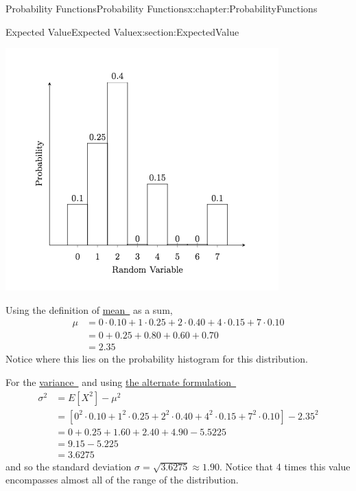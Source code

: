 \documentclass[oneside,10pt,]{book}
\newcommand{\xreffont}{\relax}
\numberwithin{equation}{section}
\begin{document}
\begin{chapterptx}{Probability Functions}{}{Probability Functions}{}{}{x:chapter:ProbabilityFunctions}
\begin{sectionptx}{Expected Value}{}{Expected Value}{}{}{x:section:ExpectedValue}
\begin{image}{0}{1}{0}
\includegraphics[width=\linewidth]{images/DiscreteHistogramExample.png}
\end{image}%
%
\par
Using the definition of \hyperlink{x:li:TheoreticalMean}{mean~{\xreffont 1}} as a sum,%
\begin{align*}
\mu & = 0 \cdot 0.10 + 1 \cdot 0.25 + 2 \cdot 0.40 + 4 \cdot 0.15 + 7 \cdot 0.10\\
& = 0 + 0.25 + 0.80 + 0.60 + 0.70\\
& = 2.35
\end{align*}
Notice where this lies on the probability histogram for this distribution.%
\par
For the \hyperlink{x:li:TheoreticalVariance}{variance~{\xreffont 2}} and using \hyperlink{x:li:TheoreticalMeasuresAlternatesVar}{the alternate formulation~{\xreffont 1}}%
\begin{align*}
\sigma^2 & = E[X^2] - \mu^2\\
& = \left [ 0^2 \cdot 0.10 + 1^2 \cdot 0.25 + 2^2 \cdot 0.40 + 4^2 \cdot 0.15 + 7^2 \cdot 0.10 \right ] - 2.35^2\\
& = 0 + 0.25 + 1.60 + 2.40 + 4.90 - 5.5225\\
& = 9.15 - 5.225\\
& = 3.6275 
\end{align*}
and so the standard deviation \(\sigma = \sqrt{3.6275} \approx 1.90\). Notice that 4 times this value encompasses almost all of the range of the distribution.%

\end{sectionptx}
\end{chapterptx}
\end{document}
